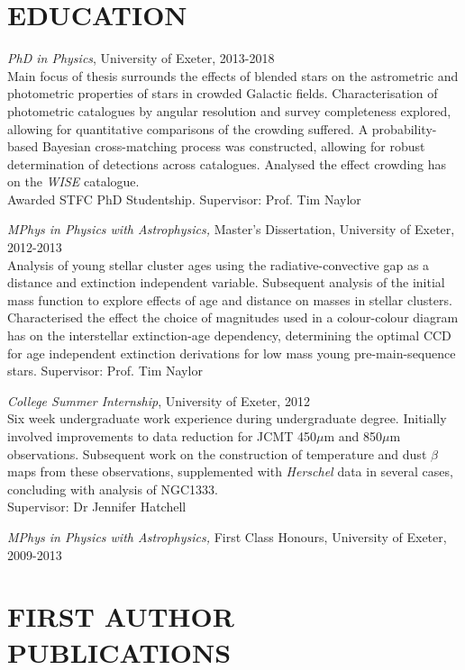 \documentclass[letter, margin, 10pt]{res} %
\begin{document}
\begin{resume}
\section{EDUCATION}

{\sl PhD in Physics}, University of Exeter, 2013-2018\\
Main focus of thesis surrounds the effects of blended stars on the astrometric and photometric properties of stars in crowded Galactic fields. Characterisation of photometric catalogues by angular resolution and survey completeness explored, allowing for quantitative comparisons of the crowding suffered. A probability-based Bayesian cross-matching process was constructed, allowing for robust determination of detections across catalogues. Analysed the effect crowding has on the \textit{WISE} catalogue. \\Awarded STFC PhD Studentship. Supervisor: Prof. Tim Naylor

{\sl MPhys in Physics with Astrophysics,} Master's Dissertation, University of Exeter, 2012-2013 \\
Analysis of young stellar cluster ages using the radiative-convective gap as a distance and extinction independent variable. Subsequent analysis of the initial mass function to explore effects of age and distance on masses in stellar clusters. Characterised the effect the choice of magnitudes used in a colour-colour diagram has on the interstellar extinction-age dependency, determining the optimal CCD for age independent extinction derivations for low mass young pre-main-sequence stars. Supervisor: Prof. Tim Naylor

{\sl College Summer Internship}, University of Exeter, 2012\\
Six week undergraduate work experience during undergraduate degree. Initially involved improvements to data reduction for JCMT 450$\mu$m and 850$\mu$m observations. Subsequent work on the construction of temperature and dust $\beta$ maps from these observations, supplemented with \textit{Herschel} data in several cases, concluding with analysis of NGC1333.\\Supervisor: Dr Jennifer Hatchell

{\sl MPhys in Physics with Astrophysics,} First Class Honours, University of Exeter, 2009-2013
\parskip 5pt
\section{FIRST AUTHOR PUBLICATIONS}


\end{resume}
\end{document}
